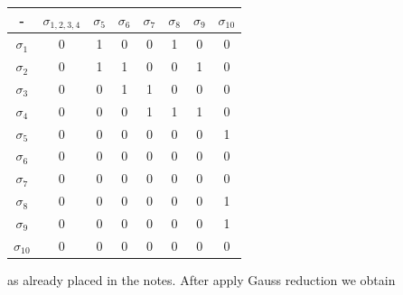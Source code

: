 \begin{center}
    \begin{tabular}{|c|c|c|c|c|c|c|c|}
        \hline
        -             & $\sigma_{1,2,3,4}$ & $\sigma_5$ & $\sigma_6$ & $\sigma_7$ & $\sigma_8$ & $\sigma_9$ & $\sigma_{10}$ \\ \hline
        $\sigma_1$    & 0                  & 1          & 0          & 0          & 1          & 0          & 0             \\ \hline
        $\sigma_2$    & 0                  & 1          & 1          & 0          & 0          & 1          & 0             \\ \hline
        $\sigma_3$    & 0                  & 0          & 1          & 1          & 0          & 0          & 0             \\ \hline
        $\sigma_4$    & 0                  & 0          & 0          & 1          & 1          & 1          & 0             \\ \hline
        $\sigma_5$    & 0                  & 0          & 0          & 0          &    0        & 0          & 1             \\ \hline
        $\sigma_6$    & 0                  & 0          & 0          & 0          & 0          & 0          & 0             \\ \hline
        $\sigma_7$    & 0                  & 0          & 0          & 0          & 0          & 0          & 0             \\ \hline
        $\sigma_8$    & 0                  & 0          & 0          & 0          & 0          & 0          & 1             \\ \hline
        $\sigma_9$    & 0                  & 0          & 0          & 0          & 0          & 0          & 1             \\ \hline
        $\sigma_{10}$ & 0                  & 0          & 0          & 0          & 0          & 0          & 0             \\ \hline
    \end{tabular}    
\end{center}

as already placed in the notes. After apply Gauss reduction we obtain 

